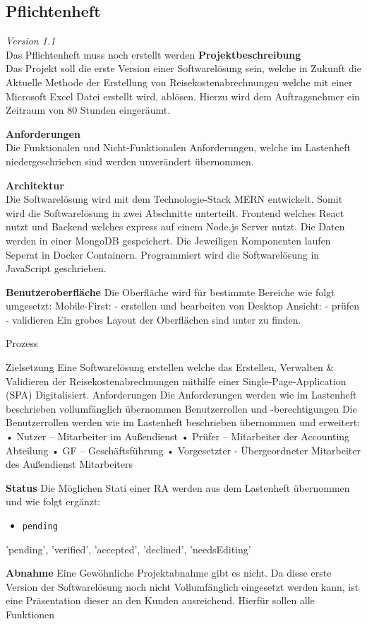 \subsection{Pflichtenheft}
\label{sec:Anhang:Pflichtenheft}
\textit{Version 1.1}\\

\todo Das Pflichtenheft muss noch erstellt werden
\textbf{Projektbeschreibung}\\
\todo 
Das Projekt soll die erste Version einer Softwarelösung sein, welche in Zukunft die Aktuelle Methode der Erstellung von Reisekostenabrechnungen welche mit einer Microsoft Excel Datei erstellt wird, ablösen.  Hierzu wird dem Auftragsnehmer ein Zeitraum von 80 Stunden eingeräumt. 

\textbf{Anforderungen}\\
Die Funktionalen und Nicht-Funktionalen Anforderungen, welche im Lastenheft niedergeschrieben sind werden unverändert übernommen.

\textbf{Architektur}\\
Die Softwarelösung wird mit dem Technologie-Stack MERN entwickelt.
Somit wird die Softwarelösung in zwei Abschnitte unterteilt. Frontend welches React nutzt und Backend welches express auf einem Node.js Server nutzt. Die Daten werden in einer MongoDB gespeichert.
Die Jeweiligen Komponenten laufen Seperat in Docker Containern.
Programmiert wird die Softwarelösung in JavaScript geschrieben.

\textbf{Benutzeroberfläche}
Die Oberfläche wird für bestimmte Bereiche wie folgt umgesetzt:
Mobile-First:
- erstellen und bearbeiten von 
Desktop Ansicht:
- prüfen
- validieren
Ein grobes Layout der Oberflächen sind unter  zu finden.

Prozess

Zielsetzung
Eine Softwarelösung erstellen welche das Erstellen, Verwalten \& Validieren der Reisekostenabrechnungen mithilfe einer Single-Page-Application (SPA) Digitalisiert.
Anforderungen
Die Anforderungen werden wie im Lastenheft beschrieben vollumfänglich übernommen
Benutzerrollen und -berechtigungen
Die Benutzerrollen werden wie im Lastenheft beschrieben übernommen und erweitert:
•	Nutzer – Mitarbeiter im Außendienst
•	Prüfer – Mitarbeiter der Accounting Abteilung
•	GF – Geschäftsführung
•	Vorgesetzter - Übergeordneter Mitarbeiter des Außendienst Mitarbeiters

\textbf{Status}
Die Möglichen Stati einer RA werden aus dem Lastenheft übernommen und wie folgt ergänzt:
\begin{itemize}
\item \verb|pending|
\end{itemize}
'pending', 'verified', 'accepted', 'declined', 'needsEditing'

\textbf{Abnahme}
Eine Gewöhnliche Projektabnahme gibt es nicht. Da diese erste Version der Softwarelösung noch nicht Vollumfänglich eingesetzt werden kann, ist eine Präsentation dieser an den Kunden ausreichend. Hierfür sollen alle Funktionen 
  
